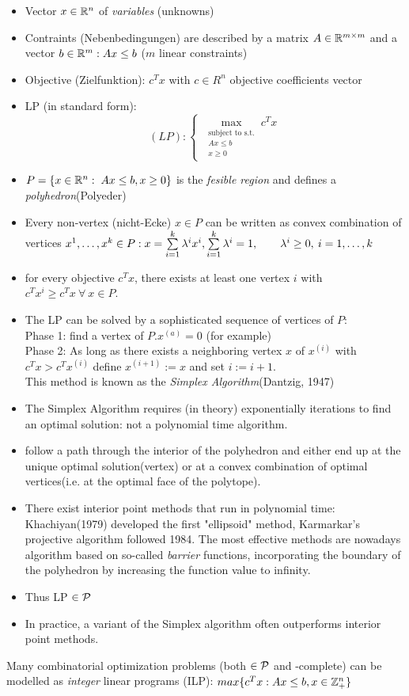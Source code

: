 \begin{itemize}
	\item Vector $x \in \mathbb{R}^n$ of \emph{variables} (unknowns)
	\item Contraints (Nebenbedingungen) are described by a matrix $A \in \mathbb{R}^{m \times m}$ and a vector $b \in \mathbb{R}^m: Ax\leq b$ ($m$ linear constraints)
	\item Objective (Zielfunktion): $c^Tx$ with $c \in R^n$ objective coefficients vector
	\item LP (in standard form):
	\[(LP): \begin{cases}
		\max_{\begin{matrix}\text{subject to s.t.} \\ Ax \leq b \\ x \geq 0\end{matrix}}c^Tx
		\end{cases}
	\]
	\item $P = \left\{ x\in \mathbb{R}^n: \; Ax \leq b, x\geq 0\right\}$ is the \emph{fesible region} and defines a \emph{polyhedron}(Polyeder)
	\item Every non-vertex (nicht-Ecke) $x \in P$ can be written as convex combination of vertices $x^1,\dots,x^k \in P: \\
	x=\sum\limits_{i=1}^k \lambda^i x^i , \sum\limits_{i=1}^k \lambda^i =1, \qquad \lambda^i \geq 0, \: i=1,\dots,k$ 
	\item for every objective $c^Tx$, there exists at least one vertex $i$ with $c^Tx^i \geq c^Tx \:\forall \: x \in P$.
	\item The LP can be solved by a sophisticated sequence of vertices of $P$:\\
	Phase 1: find a vertex of $P. x^{(a)}=0$ (for example)\\
	Phase 2: As long as there exists a neighboring vertex $x$ of $x^{(i)}$ with $c^Tx > c^Tx^{(i)}$ define $x^{(i+1)}:=x$ and set $i:=i+1$.\\
	This method is known as the \emph{Simplex Algorithm}(Dantzig, 1947)
	\item The Simplex Algorithm requires (in theory) exponentially iterations to find an optimal solution: not a polynomial time algorithm.
	\item {} follow a path through the interior of the polyhedron and either end up at the unique optimal solution(vertex) or at a convex combination of optimal vertices(i.e. at the optimal face of the polytope).
	\item There exist interior point methods that run in polynomial time: Khachiyan(1979) developed the first "ellipsoid" method, Karmarkar's projective algorithm followed 1984. The most effective methods are nowadays algorithm based on so-called \emph{barrier} functions, incorporating the boundary of the polyhedron by increasing the function value to infinity.
	\item Thus LP $\in \mathcal{P}$
	\item In practice, a variant of the Simplex algorithm often outperforms interior point methods.
\end{itemize}
Many combinatorial optimization problems (both $\in \mathcal{P}$ and \npoly-complete) can be modelled as \emph{integer} linear programs (ILP): $max\{c^T x:Ax \leq b, x \in \mathbb{Z}_+^n\}$

